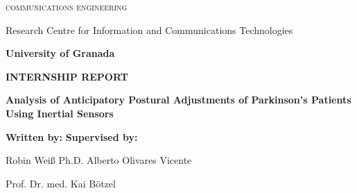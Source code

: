 \begin{titlepage}
\label{ch:titlepage}
\begin{center}

{\Large\textsc{communications engineering}}

Research Centre for Information and Communications Technologies

\textbf{University of Granada}

\vspace{0.5cm}

\begin{figure}[h]
	\centering
	\label{fig:ugr}
\end{figure}

\vspace{0.5cm}
\textbf{INTERNSHIP REPORT}

\vspace{0.9cm}

{\Huge\textbf{Analysis of Anticipatory Postural Adjustments of Parkinson's Patients Using Inertial Sensors}}

\end{center}

\vspace{1.5cm}
\textbf{Written by:}  \hfill \textbf{Supervised by:}

Robin Weiß \hfill Ph.D. Alberto Olivares Vicente

\hfill Prof. Dr. med. Kai B\"{o}tzel

\end{titlepage}
